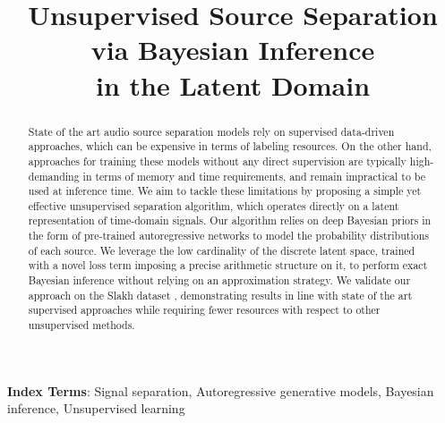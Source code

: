 \documentclass[a4paper]{article}
\title{Unsupervised Source Separation via Bayesian Inference\\ in the Latent Domain}
\begin{document}
\maketitle


\begin{abstract}
State of the art audio source separation models rely on supervised data-driven approaches, which can be expensive in terms of labeling resources. On the other hand, approaches for training these models without any direct supervision are typically high-demanding in terms of memory and time requirements, and remain impractical to be used at inference time. We aim to tackle these limitations by proposing a simple yet effective unsupervised separation algorithm, which operates directly on a latent representation of time-domain signals. Our algorithm relies on deep Bayesian priors in the form of pre-trained autoregressive networks to model the probability distributions of each source. We leverage the low cardinality of the discrete latent space, trained with a novel loss term imposing a precise arithmetic structure on it, to perform exact Bayesian inference without relying on an approximation strategy. 
We validate our approach on the Slakh dataset \cite{manilow2019}, demonstrating results in line with state of the art supervised approaches while requiring fewer resources with respect to other unsupervised methods.
\end{abstract}

\noindent\textbf{Index Terms}: 
Signal separation, Autoregressive generative models, Bayesian inference, Unsupervised learning
\end{document}

